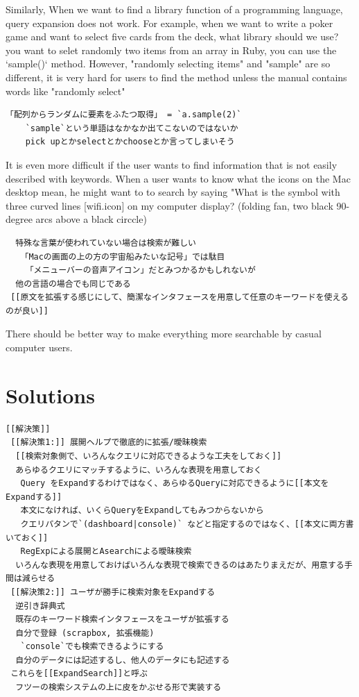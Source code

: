 \documentclass[manuscript,screen,review]{acmart}
\begin{document}
Similarly, 
When we want to find a library function of a programming language, query expansion does not work.
For example, when we want to write a poker game and want to select five cards from the deck,
what library should we use?
you want to selet randomly two items from an array in Ruby,
you can use the `sample()` method.
However, "randomly selecting items" and "sample" are so different, it is very hard for users to
find the method unless the manual contains words like "randomly select"

\begin{verbatim}
「配列からランダムに要素をふたつ取得」 = `a.sample(2)`
    `sample`という単語はなかなか出てこないのではないか
    pick upとかselectとかchooseとか言ってしまいそう
\end{verbatim}

It is even more difficult if the user wants to find information that is not easily described with keywords.
When a user wants to know what the icons on the Mac desktop mean, he might want to to 
search by saying "What is the symbol with three curved lines [wifi.icon] on my computer display?
(folding fan, two black 90-degree arcs above a black circcle)

\begin{verbatim}
  特殊な言葉が使われていない場合は検索が難しい
   「Macの画面の上の方の宇宙船みたいな記号」では駄目
    「メニューバーの音声アイコン」だとみつかるかもしれないが
  他の言語の場合でも同じである
 [[原文を拡張する感じにして、簡潔なインタフェースを用意して任意のキーワードを使えるのが良い]]
\end{verbatim}

There should be better way to make everything more searchable by casual computer users.

\section{Solutions}

\begin{verbatim}
[[解決策]]
 [[解決策1:]] 展開ヘルプで徹底的に拡張/曖昧検索
  [[検索対象側で、いろんなクエリに対応できるような工夫をしておく]]
  あらゆるクエリにマッチするように、いろんな表現を用意しておく
   Query をExpandするわけではなく、あらゆるQueryに対応できるように[[本文をExpandする]]
   本文になければ、いくらQueryをExpandしてもみつからないから
   クエリパタンで`(dashboard|console)` などと指定するのではなく、[[本文に両方書いておく]]
   RegExpによる展開とAsearchによる曖昧検索
  いろんな表現を用意しておけばいろんな表現で検索できるのはあたりまえだが、用意する手間は減らせる
 [[解決策2:]] ユーザが勝手に検索対象をExpandする
  逆引き辞典式
  既存のキーワード検索インタフェースをユーザが拡張する
  自分で登録 (scrapbox, 拡張機能)
   `console`でも検索できるようにする
  自分のデータには記述するし、他人のデータにも記述する
 これらを[[ExpandSearch]]と呼ぶ
  フツーの検索システムの上に皮をかぶせる形で実装する
\end{verbatim}
\end{document}
